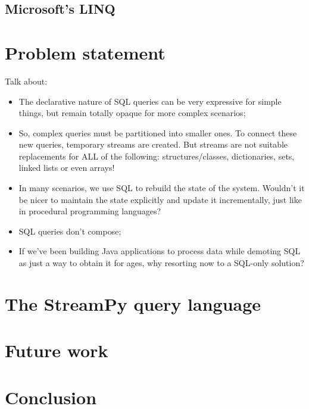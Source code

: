 \documentclass{report}
\begin{document}
\section{Microsoft's LINQ}

\chapter{Problem statement}\label{problem-statement}

Talk about:
\begin{itemize}
\item The declarative nature of SQL queries can be very expressive for simple things, but remain totally opaque for more complex scenarios;
\item So, complex queries must be partitioned into smaller ones. To connect these new queries, temporary streams are created. But streams are not suitable replacements for ALL of the following: structures/classes, dictionaries, sets, linked lists or even arrays!
\item In many scenarios, we use SQL to rebuild the state of the system. Wouldn't it be nicer to maintain the state explicitly and update it incrementally, just like in procedural programming languages?
\item SQL queries don't compose;
\item If we've been building Java applications to process data while demoting SQL as just a way to obtain it for ages, why resorting now to a SQL-only solution?
\end{itemize}

\chapter{The StreamPy query language}\label{streampy}

\chapter{Future work}\label{future-work}

\chapter{Conclusion}\label{conclusion}
\end{document}
